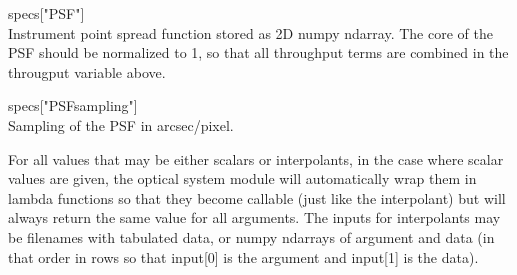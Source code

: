 \documentclass[cleanfoot]{asme2ej}
\begin{document}
\begin{itemize}
\begin{description}
\begin{description}
            \item specs["PSF"] \hfill \\
            Instrument point spread function stored as 2D numpy ndarray.  The core of the PSF should be normalized to 1, so that all throughput terms are combined in the througput variable above.
            \item specs["PSFsampling"] \hfill \\
            Sampling of the PSF in arcsec/pixel.
        \end{description}
    \end{description}
\end{itemize}

For all values that may be either scalars or interpolants, in the case where scalar values are given, the optical system module will automatically wrap them in lambda functions so that they become callable (just like the interpolant) but will always return the same value for all arguments.  The inputs for interpolants may be filenames with tabulated data, or numpy ndarrays of argument and data (in that order in rows so that input[0] is the argument and input[1] is the data).
\end{document}

